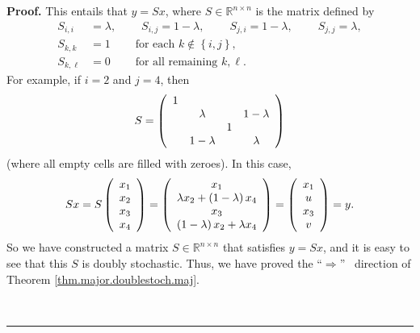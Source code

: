 \documentclass[numbers=enddot,12pt,final,onecolumn,notitlepage]{scrartcl}%
\numberwithin{exer}{subsection}
\theoremstyle{definition}
\newenvironment{proof}[1][Proof]{\noindent\textbf{#1.} }{\ \rule{0.5em}{0.5em}}
\begin{document}
\begin{proof}
This entails that $y=Sx$, where $S\in\mathbb{R}^{n\times n}$ is the matrix
defined by%
\begin{align*}
S_{i,i}  &  =\lambda,\ \ \ \ \ \ \ \ \ \ S_{i,j}=1-\lambda
,\ \ \ \ \ \ \ \ \ \ S_{j,i}=1-\lambda,\ \ \ \ \ \ \ \ \ \ S_{j,j}=\lambda,\\
S_{k,k}  &  =1\ \ \ \ \ \ \ \ \ \ \text{for each }k\notin\left\{  i,j\right\}
,\\
S_{k,\ell}  &  =0\ \ \ \ \ \ \ \ \ \ \text{for all remaining }k,\ell.
\end{align*}
For example, if $i=2$ and $j=4$, then
\[
S=\left(
\begin{array}
[c]{cccc}%
1 &  &  & \\
& \lambda &  & 1-\lambda\\
&  & 1 & \\
& 1-\lambda &  & \lambda
\end{array}
\right)
\]
(where all empty cells are filled with zeroes). In this case,%
\[
Sx=S\left(
\begin{array}
[c]{c}%
x_{1}\\
x_{2}\\
x_{3}\\
x_{4}%
\end{array}
\right)  =\left(
\begin{array}
[c]{c}%
x_{1}\\
\lambda x_{2}+\left(  1-\lambda\right)  x_{4}\\
x_{3}\\
\left(  1-\lambda\right)  x_{2}+\lambda x_{4}%
\end{array}
\right)  =\left(
\begin{array}
[c]{c}%
x_{1}\\
u\\
x_{3}\\
v
\end{array}
\right)  =y.
\]
So we have constructed a matrix $S\in\mathbb{R}^{n\times n}$ that satisfies
$y=Sx$, and it is easy to see that this $S$ is doubly stochastic. Thus, we
have proved the \textquotedblleft$\Longrightarrow$\textquotedblright%
\ direction of Theorem \ref{thm.major.doublestoch.maj}. \medskip


\end{proof}
\end{document}
